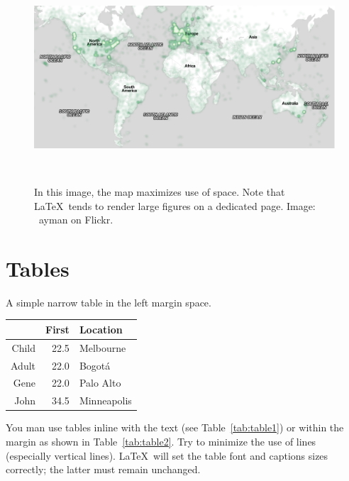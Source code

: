 \documentclass[sigchi-a, authorversion]{acmart}
\begin{document}
\begin{figure}
  \includegraphics[width=\fulltextwidth]{map}
  \caption{In this image, the map maximizes use of space.
    Note that \LaTeX\ tends to render large figures on a
    dedicated page. Image: \ccbynd~ayman on Flickr.}~\label{fig:map}
\end{figure}


\section{Tables}


\begin{margintable}
    \caption{A simple narrow table in the left margin
      space.}
    \label{tab:table2}
    \begin{tabular}{r r l}
      & {\small \textbf{First}}
      & {\small \textbf{Location}} \\
      \toprule
      Child & 22.5 & Melbourne \\
      Adult & 22.0 & Bogot\'a \\
      \midrule
      Gene & 22.0 & Palo Alto \\
      John & 34.5 & Minneapolis \\
      \bottomrule
    \end{tabular}
\end{margintable}

You man use tables inline with the text (see Table~\ref{tab:table1})
or within the margin as shown in Table~\ref{tab:table2}. Try to
minimize the use of lines (especially vertical lines). \LaTeX\ will
set the table font and captions sizes correctly; the latter must
remain unchanged.
\end{document}
